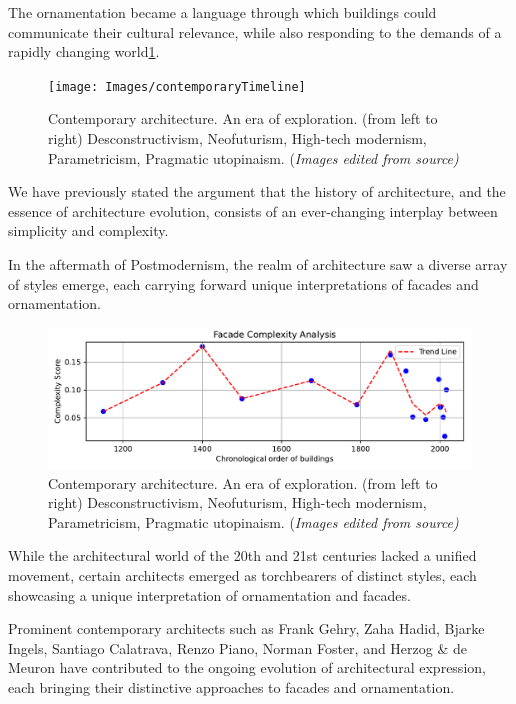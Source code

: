 The ornamentation became a language through which buildings could communicate their cultural relevance, while also responding to the demands of a rapidly changing world\ref{fig:contemporarytimeline}.

     \begin{figure}[htb]
          \centering
          \texttt{[image: Images/contemporaryTimeline]}
          \caption{Contemporary architecture. An era of exploration. (from left to right) Desconstructivism, Neofuturism, High-tech modernism, Parametricism, Pragmatic utopinaism.  (\textit{Images edited from source)}}
          \label{fig:contemporarytimeline}
        \end{figure}

We have previously stated the argument that the history of architecture, and the essence of architecture evolution, consists of an ever-changing interplay between simplicity and complexity.

In the aftermath of Postmodernism, the realm of architecture saw a diverse array of styles emerge, each carrying forward unique interpretations of facades and ornamentation.


     \begin{figure}[htb]
          \centering
          \includegraphics[width= \linewidth]{Graphs/complexitygraph}
          \caption{Contemporary architecture. An era of exploration. (from left to right) Desconstructivism, Neofuturism, High-tech modernism, Parametricism, Pragmatic utopinaism.  (\textit{Images edited from source)}}
          \label{fig:complexitygraph}
        \end{figure}

While the architectural world of the 20th and 21st centuries lacked a unified movement, certain architects emerged as torchbearers of distinct styles, each showcasing a unique interpretation of ornamentation and facades.

Prominent contemporary architects such as Frank Gehry, Zaha Hadid, Bjarke Ingels, Santiago Calatrava, Renzo Piano, Norman Foster, and Herzog & de Meuron have contributed to the ongoing evolution of architectural expression, each bringing their distinctive approaches to facades and ornamentation.

